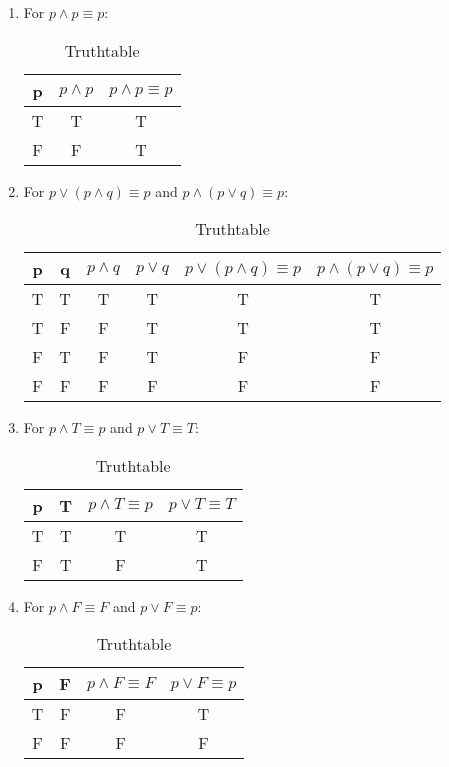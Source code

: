 \documentclass[english,10pt,a4paper]{article}
\begin{document}
\begin{enumerate}[a]
\item For $p \wedge p \equiv p$:
\begin{table}[h]
\centering
	\begin{tabular}{c|c|c}
	\textbf{p} & $p \wedge p$ &\textbf{$p \wedge p \equiv p$} \\\hline
	T & T  & T\\\hline 
	F & F & T
	\end{tabular}
\caption{Truthtable}
\label{tab:title}
\end{table}

\item  For $p \vee (p \wedge q) \equiv p$ and $p \wedge (p \vee q) \equiv p$:
\begin{table}[h]
\centering
	\begin{tabular}{c|c|c|c|c|c}
	\textbf{p} & 
	\textbf{q} & 
	$p \wedge q$ & 
	$p \vee q$ & 
	$p \vee (p \wedge q) \equiv p$ & 
	$p \wedge (p \vee q) \equiv p$ \\\hline
	T & T & T & T & T & T\\\hline 
	T & F & F & T & T & T\\\hline
	F & T & F & T & F & F\\\hline
	F & F & F & F & F & F\\\hline
	\end{tabular}
\caption{Truthtable}
\label{tab:title}
\end{table}

\item For $p \wedge T \equiv p$ and $p \vee T \equiv T$:
\begin{table}[h]
\centering
	\begin{tabular}{c|c|c|c}
	\textbf{p} & 
	\textbf{T} & 
	$p \wedge T \equiv p$ & 
	$p \vee T \equiv T$   \\\hline
	T & T & T & T \\\hline 
	F & T & F & T \\\hline
	\end{tabular}
\caption{Truthtable}
\label{tab:title}
\end{table}


\item For $p \wedge F \equiv F$ and $p \vee F \equiv p$:
\begin{table}[h]
\centering
	\begin{tabular}{c|c|c|c}
	\textbf{p} & 
	\textbf{F} & 
	$p \wedge F \equiv F$ & 
	$p \vee F \equiv p$   \\\hline
	T & F & F & T \\\hline 
	F & F & F & F \\\hline
	\end{tabular}
\caption{Truthtable}
\label{tab:title}
\end{table}
\end{enumerate}
\end{document}
